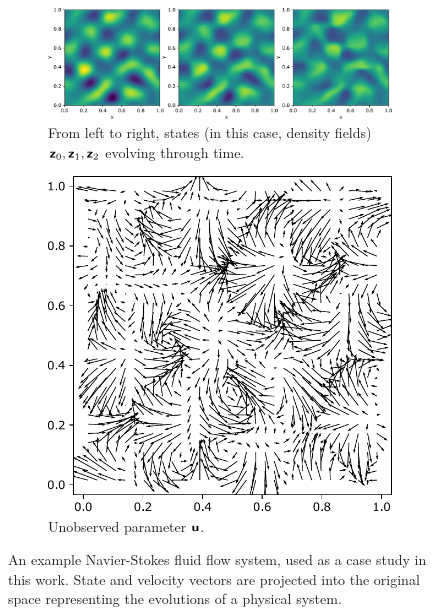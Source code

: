 \begin{figure}[h!t]
     \centering
    \begin{subfigure}{0.7\textwidth}
        \centering
        \includegraphics[scale=0.35]{ns_p_trim.pdf}
         \caption{From left to right, states (in this case, density fields) $\boldsymbol{\mathsf{z}}_{0}, \boldsymbol{\mathsf{z}}_{1}, \boldsymbol{\mathsf{z}}_{2}$ evolving through time.}
         \label{fig:states}
     \end{subfigure}
     \begin{subfigure}{0.25\textwidth}
         \centering
        \includegraphics[scale=0.25]{ns_force_trim.pdf}
         \caption{Unobserved parameter $\boldsymbol{\mathsf{u}}$.}
         \label{fig:forcing}
     \end{subfigure}
     \hfill
    \centering
    \caption{An example Navier-Stokes fluid flow system, used as a case study in this work. State and velocity vectors are projected into the original space representing the evolutions of a physical system.}
    \label{fig:dynamicalsystem}
\end{figure}


